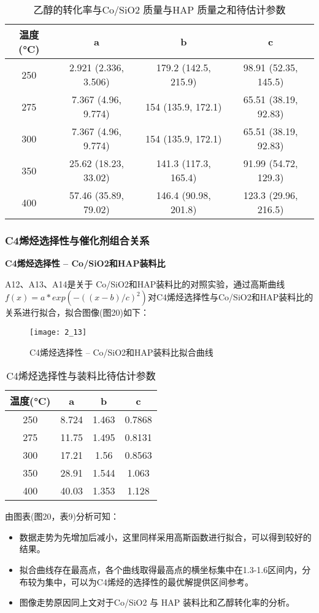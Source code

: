 \documentclass[withoutpreface,bwprint]{cumcmthesis} %
\begin{document}
\begin{table}[!htbp]
	\caption{乙醇的转化率与Co/SiO2 质量与HAP 质量之和待估计参数}\label{tab:001} \centering
	\begin{tabular}{cccc}
		\toprule[1.5pt]
		温度(°C) & a & b & c \\
		\midrule[1pt]
		250 & 2.921  (2.336, 3.506) &  179.2  (142.5, 215.9) &  98.91  (52.35, 145.5) \\
		275 & 7.367  (4.96, 9.774) &  154  (135.9, 172.1)& 65.51  (38.19, 92.83) \\
		300 & 7.367  (4.96, 9.774) & 154  (135.9, 172.1)& 65.51  (38.19, 92.83) \\
		350 &25.62  (18.23, 33.02) &  141.3  (117.3, 165.4)& 91.99  (54.72, 129.3)  \\
		400 &57.46  (35.89, 79.02) &   146.4  (90.98, 201.8)&   123.3  (29.96, 216.5)  \\
		\bottomrule[1.5pt]
	\end{tabular}
\end{table}


\subsubsection{C4烯烃选择性与催化剂组合关系}
\textbf{C4烯烃选择性 -- Co/SiO2和HAP装料比}

A12、A13、A14是关于 Co/SiO2和HAP装料比的对照实验，通过高斯曲线$f(x) =  a*exp(-((x-b)/c)^2)$对C4烯烃选择性与Co/SiO2和HAP装料比的关系进行拟合，拟合图像(图20)如下：

\begin{figure}[!h]
	\centering
	\texttt{[image: 2\_13]}
	\caption{C4烯烃选择性 -- Co/SiO2和HAP装料比拟合曲线}
	\label{fig:circuit-diagram1}
\end{figure}

\begin{table}[!htbp]
	\caption{C4烯烃选择性与装料比待估计参数}\label{tab:001} \centering
	\begin{tabular}{cccc}
		\toprule[1.5pt]
		温度(°C) & a & b & c \\
		\midrule[1pt]
		250 & 8.724 &  1.463 &  0.7868 \\
		275 & 11.75 &   1.495 & 0.8131 \\
		300 &17.21 & 1.56&  0.8563 \\
		350 &28.91 &  1.544& 1.063   \\
		400 &40.03 &   1.353 & 1.128 \\
		\bottomrule[1.5pt]
	\end{tabular}
\end{table}
\newpage
由图表(图20，表9)分析可知：
\begin{itemize}
	\item 数据走势为先增加后减小，这里同样采用高斯函数进行拟合，可以得到较好的结果。
	\item 拟合曲线存在最高点，各个曲线取得最高点的横坐标集中在1.3-1.6区间内，分布较为集中，可以为C4烯烃的选择性的最优解提供区间参考。
	\item 图像走势原因同上文对于Co/SiO2 与 HAP 装料比和乙醇转化率的分析。
\end{itemize}
\end{document}
